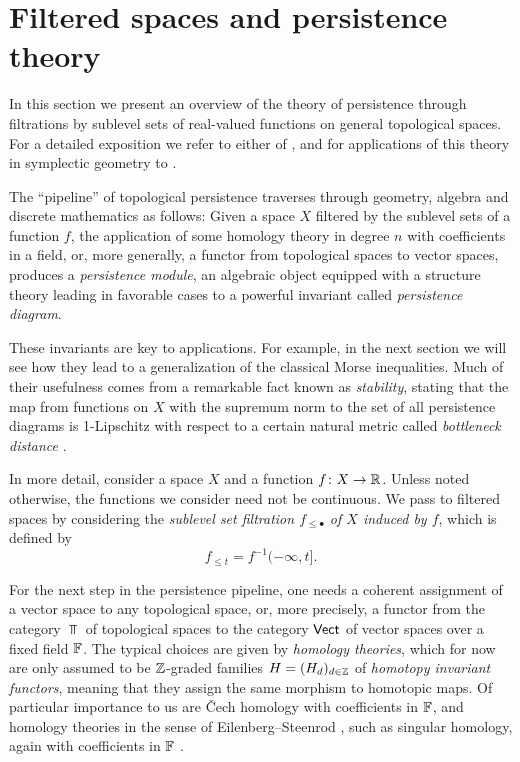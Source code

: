 
\section{Filtered spaces and persistence theory} \label{s:persistence}

In this section we present an overview of the theory of persistence through filtrations by sublevel sets of real-valued functions on general topological spaces.
For a detailed exposition we refer to either of \cite{Chazal.2016a, Oudot.2015, Polterovich.2020}, and for applications of this theory in symplectic geometry to
\cite{Polterovich.2016, Usher.2016, LeRoux.2018, Shelukhin.2019}.

The ``pipeline'' of topological persistence traverses through geometry, algebra and discrete mathematics as follows:
Given a space $X$ filtered by the sublevel sets of a function $f$, the application of some homology theory in degree $n$ with coefficients in a field, or, more generally, a functor from topological spaces to vector spaces, produces a \emph{persistence module}, an algebraic object equipped with a structure theory leading in favorable cases to a powerful invariant called \emph{persistence diagram}.

These invariants are key to applications.
For example, in the next section we will see how they lead to a generalization of the classical Morse inequalities.
Much of their usefulness comes from a remarkable fact known as \emph{stability}, stating that the map from functions on $X$ with the supremum norm to the set of all persistence diagrams is 1-Lipschitz with respect to a certain natural metric called \emph{bottleneck distance} \cite{Cohen-Steiner.2007}.

In more detail, consider a space $X$ and a function $f \colon X \to \mathbb{R}$.
Unless noted otherwise, the functions we consider need not be continuous.
We pass to filtered spaces by considering the \emph{sublevel set filtration $f_{\leq \bullet}$ of $X$ induced by $f$}, which is defined by
\begin{equation*}
f_{\leq t} = f^{-1}(-\infty, t].
\end{equation*}

For the next step in the persistence pipeline, one needs a coherent assignment of a vector space to any topological space, or, more precisely, a functor from the category $\Top$ of topological spaces to the category $\mathsf{Vect}$ of vector spaces over a fixed field $\mathbb{F}$.
The typical choices are given by \emph{homology theories}, which for now are only assumed to be $\mathbb{Z}$-graded families $H = (H_d)_{d \in \mathbb{Z}}$ of \emph{homotopy invariant functors}, meaning that they assign the same morphism to homotopic maps.
Of particular importance to us are \v{C}ech homology \cite[Section IX--X]{Eilenberg.1952} with coefficients in $\mathbb{F}$, and homology theories in the sense of Eilenberg--Steenrod \cite[Section I]{Eilenberg.1952}, such as singular homology, again with coefficients in $\mathbb{F}$ \cite{Eilenberg.1944}.

